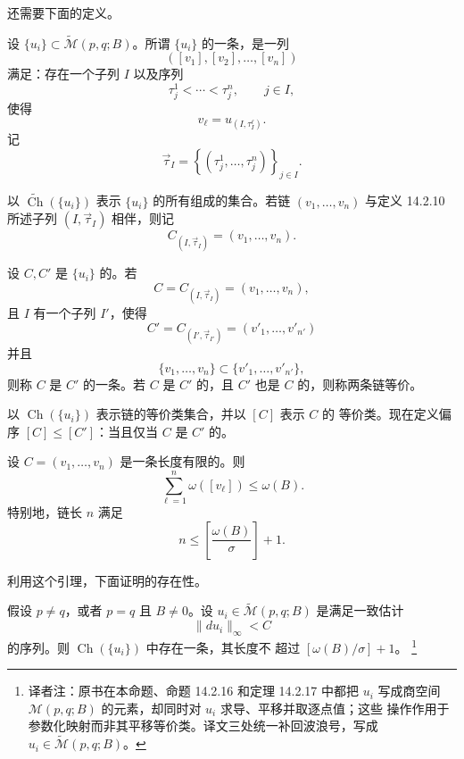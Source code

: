 还需要下面的定义。

\begin{definition}
\label{def:chain-of-local-limits}
设 $\{u_i\}\subset\widetilde{\mathcal M}(p,q;B)$。所谓 $\{u_i\}$ 的一条\termLocalLimitChain{}，是一列\termLocalLimit{}
\[
  ([v_1],[v_2],\ldots,[v_n])
\]
满足：存在一个子列 $I$ 以及序列
\[
  \tau_j^1<\cdots<\tau_j^n,
  \qquad j\in I,
\]
使得
\[
  v_\ell=u_{(I,\tau_I^\ell)}.
\]
记
\[
  \vec\tau_I
  =
  \left\{(\tau_j^1,\ldots,\tau_j^n)\right\}_{j\in I}.
\]
\end{definition}

以 $\widetilde{\operatorname{Ch}}(\{u_i\})$ 表示 $\{u_i\}$ 的所有\termLocalLimitChain{}组成的集合。若链 $(v_1,\ldots,v_n)$ 与定义 14.2.10
所述子列 $(I,\vec\tau_I)$ 相伴，则记
\[
  C_{(I,\vec\tau_I)}=(v_1,\ldots,v_n).
\]

\begin{definition}
\label{def:subchain-equivalence}
设 $C,C'$ 是 $\{u_i\}$ 的\termLocalLimitChain{}。若
\[
  C=C_{(I,\vec\tau_I)}=(v_1,\ldots,v_n),
\]
且 $I$ 有一个子列 $I'$，使得
\[
  C'=C_{(I',\vec\tau_{I'})}=(v'_1,\ldots,v'_{n'})
\]
并且
\[
  \{v_1,\ldots,v_n\}\subset\{v'_1,\ldots,v'_{n'}\},
\]
则称 $C$ 是 $C'$ 的一条\termSubchain{}。若 $C$ 是 $C'$ 的\termSubchain{}，且
$C'$ 也是 $C$ 的\termSubchain{}，则称两条链等价。
\end{definition}

以 $\operatorname{Ch}(\{u_i\})$ 表示链的等价类集合，并以 $[C]$ 表示 $C$ 的
等价类。现在定义偏序 $[C]\leq[C']$：当且仅当 $C$ 是 $C'$ 的\termSubchain{}。

\begin{lemma}
\label{lem:local-limit-chain-energy-bound}
设 $C=(v_1,\ldots,v_n)$ 是一条长度有限的\termLocalLimitChain{}。则
\begin{equation}
  \sum_{\ell=1}^n\omega([v_\ell])\leq\omega(B).
\label{eq:local-limit-chain-area-bound}
\end{equation}
特别地，链长 $n$ 满足
\begin{equation}
  n\leq
  \left[\frac{\omega(B)}{\sigma}\right]+1.
\label{eq:local-limit-chain-length-bound}
\end{equation}
\end{lemma}

利用这个引理，下面证明\termMaximalChain{}的存在性。

\begin{proposition}
\label{prop:existence-maximal-local-limit-chain}
假设 $p\neq q$，或者 $p=q$ 且 $B\neq0$。设
$u_i\in\widetilde{\mathcal M}(p,q;B)$ 是满足一致估计
\[
  \|du_i\|_\infty<C
\]
的序列。则 $\operatorname{Ch}(\{u_i\})$ 中存在一条\termMaximalChain{}，其长度不
超过 $[\omega(B)/\sigma]+1$。
\footnote{译者注：原书在本命题、命题 14.2.16 和定理 14.2.17 中都把 $u_i$
写成商空间 $\mathcal M(p,q;B)$ 的元素，却同时对 $u_i$ 求导、平移并取逐点值；这些
操作作用于参数化映射而非其平移等价类。译文三处统一补回波浪号，写成
$u_i\in\widetilde{\mathcal M}(p,q;B)$。}
\end{proposition}

